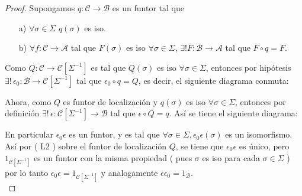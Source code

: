 \documentclass{article}
\begin{document}
		\begin{proof}
			Supongamos $q:\mathscr{C}\to \mathscr{B}$ es un funtor tal que 
			\begin{itemize}
				\item[a)] $\forall \sigma\in \Sigma$ \quad $q(\sigma)$ es iso.
				\item[b)] $\forall f:\mathscr{C}\to \mathscr{A}$ tal que $F(\sigma)$ es iso $\forall \sigma\in \Sigma$, $\exists ! \bar{F}:\mathscr{B}\to\mathscr{A}$
				tal que $\bar{F}\circ q=F$.\\
			\end{itemize}
			
			Como $Q:\mathscr{C}\to\mathscr{C}[\Sigma^{-1}]$ es tal que $Q(\sigma)$ es iso $\forall \sigma \in \Sigma$, entonces por 
			hipótesis $\exists !\,\epsilon_0:\mathscr{B}\to \mathscr{C}[\Sigma^{-1}]$ tal que $\epsilon_0\circ q=Q$, es decir, el siguiente diagrama conmuta:\\
			\centerline{
			}
			Ahora, como $Q$ es funtor de localización y $q(\sigma)$ es iso $\forall \sigma\in \Sigma$, entonces por definición 
			$\exists !\,\epsilon:\mathscr{C}[\Sigma^{-1}]\to \mathscr{B}$ tal que $\epsilon\circ Q=q$. Así se tiene el siguiente diagrama:\\
			\centerline{
			}
			
			En particular $\epsilon_0\epsilon$ es un funtor, y es tal que $\forall \sigma\in \Sigma,$\quad $\epsilon_0\epsilon(\sigma)$ es un isomorfismo. Así por ( L2 )
			sobre el funtor de localización $Q$, se tiene que $\epsilon_0\epsilon$ es único, pero $1_{\mathscr{C}[\Sigma^{-1}]}$ es un funtor con la misma
			propiedad ( pues $\sigma$ es iso para cada $\sigma \in \Sigma$  ) por lo tanto $\epsilon_0\epsilon=1_{\mathscr{C}[\Sigma^{-1}]}$ y analogamente
			$\epsilon\epsilon_0=1_{\mathscr{B}}$.\\
		\end{proof}
\end{document}
